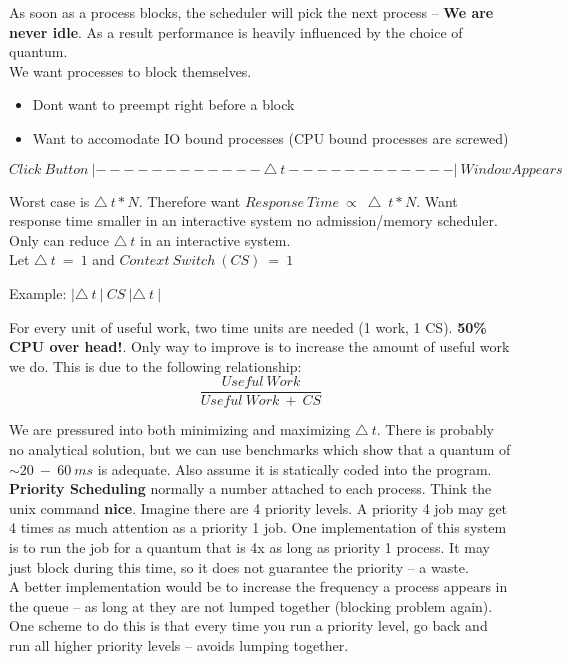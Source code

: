 \documentclass[../base_file/cs1550_notes.tex]{subfiles}
\begin{document}
As soon as a process blocks, the scheduler will pick the next process -- \textbf{We are never idle}\@.  As a result
performance is heavily influenced by the choice of quantum.\\

We want processes to block themselves.
\begin{itemize}
\item Dont want to preempt right before a block
\item Want to accomodate IO bound processes (CPU bound processes are screwed)
\end{itemize}
\begin{center}
$Click\ Button\ |------------\bigtriangleup\ t------------|\ Window Appears$
\end{center}
Worst case is $\bigtriangleup\ t * N$\@. Therefore want $Response\ Time\ \propto\ \bigtriangleup\ t * N$\@.  Want
response time smaller in an interactive system no admission/memory scheduler\@.
Only can reduce $\bigtriangleup\ t$ in an interactive system\@.\\
Let $\bigtriangleup\ t\ =\ 1$ and $Context\ Switch\ (CS)\ =\ 1$
\begin{center}
Example: $|\bigtriangleup\ t\ |\ CS\ |\bigtriangleup\ t\ |$
\end{center}
For every unit of useful work, two time units are needed (1 work, 1 CS)\@. \textbf{50\% CPU over head!}\@. Only way
to improve is to increase the amount of useful work we do.  This is due to the following relationship:
\[
	\frac{Useful\ Work}{Useful\ Work\ +\ CS}
\]

We are pressured into both minimizing and maximizing $\bigtriangleup\ t$\@.  There is probably no analytical solution,
but we can use benchmarks which show that a quantum of $\sim20\ - \ 60\ ms$ is adequate\@.  Also assume it is statically
coded into the program.\\

\textbf{Priority Scheduling} normally a number attached to each process\@.  Think the unix command \textbf{nice}.
Imagine there are 4 priority levels\@.  A priority 4 job may get 4 times as much attention as a priority 1 job.  One
implementation of this system is to run the job for a quantum that is 4x as long as priority 1 process.  It may just
block during this time, so it does not guarantee the priority -- a waste.\\

A better implementation would be to increase the frequency a process appears in the queue -- as long at they are not 
lumped together (blocking problem again).  One scheme to do this is that every time you run a priority level, go back
and run all higher priority levels -- avoids lumping together.
\end{document}

